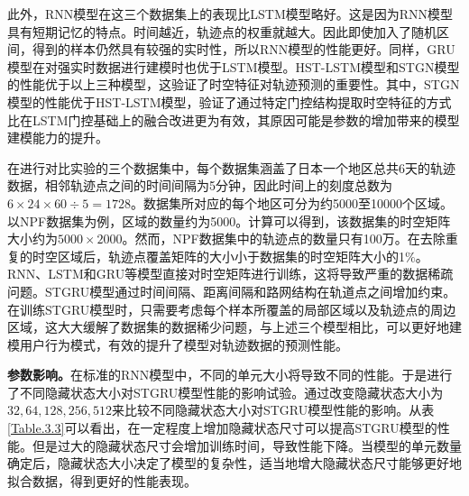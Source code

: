 \documentclass[master]{thesis-uestc}
\begin{document}
此外，RNN模型在这三个数据集上的表现比LSTM模型略好。这是因为RNN模型具有短期记忆的特点。时间越近，轨迹点的权重就越大。因此即使加入了随机区间，得到的样本仍然具有较强的实时性，所以RNN模型的性能更好。同样，GRU模型在对强实时数据进行建模时也优于LSTM模型。HST-LSTM模型和STGN模型的性能优于以上三种模型，这验证了时空特征对轨迹预测的重要性。其中，STGN模型的性能优于HST-LSTM模型，验证了通过特定门控结构提取时空特征的方式比在LSTM门控基础上的融合改进更为有效，其原因可能是参数的增加带来的模型建模能力的提升。

在进行对比实验的三个数据集中，每个数据集涵盖了日本一个地区总共6天的轨迹数据，相邻轨迹点之间的时间间隔为5分钟，因此时间上的刻度总数为$6\times 24 \times 60 \div 5 = 1728$。数据集所对应的每个地区可分为约5000至10000个区域。以NPF数据集为例，区域的数量约为5000。计算可以得到，该数据集的时空矩阵大小约为$5000\times 2000$。然而，NPF数据集中的轨迹点的数量只有100万。在去除重复的时空区域后，轨迹点覆盖矩阵的大小小于数据集的时空矩阵大小的1$\%$。RNN、LSTM和GRU等模型直接对时空矩阵进行训练，这将导致严重的数据稀疏问题。STGRU模型通过时间间隔、距离间隔和路网结构在轨道点之间增加约束。在训练STGRU模型时，只需要考虑每个样本所覆盖的局部区域以及轨迹点的周边区域，这大大缓解了数据集的数据稀少问题，与上述三个模型相比，可以更好地建模用户行为模式，有效的提升了模型对轨迹数据的预测性能。


\textbf{参数影响。}在标准的RNN模型中，不同的单元大小将导致不同的性能。于是进行了不同隐藏状态大小对STGRU模型性能的影响试验。通过改变隐藏状态大小为$32,64,128,256,512$来比较不同隐藏状态大小对STGRU模型性能的影响。从表\ref{Table.3.3}可以看出，在一定程度上增加隐藏状态尺寸可以提高STGRU模型的性能。但是过大的隐藏状态尺寸会增加训练时间，导致性能下降。当模型的单元数量确定后，隐藏状态大小决定了模型的复杂性，适当地增大隐藏状态尺寸能够更好地拟合数据，得到更好的性能表现。
\begin{table}[ht]
\centering
\caption{STGRU模型在不同隐藏状态大小下的性能}
\label{Table.3.3}
\end{table}
\end{document}
